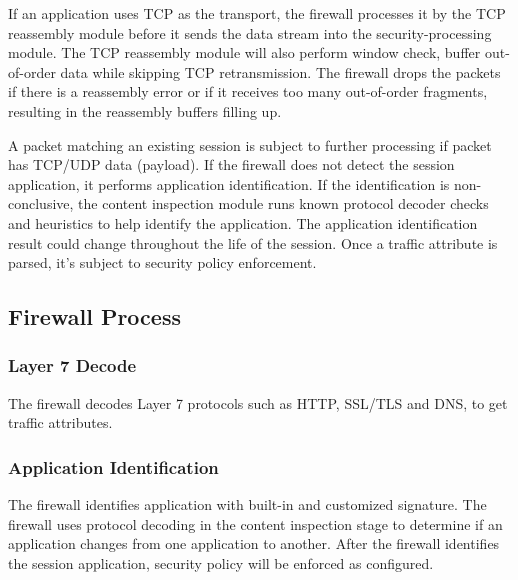 If an application uses TCP as the transport, the firewall processes it by the TCP reassembly module before it sends the data stream into the security-processing module. The TCP reassembly module will also perform window check, buffer out-of-order data while skipping TCP retransmission. The firewall drops the packets if there is a reassembly error or if it receives too many out-of-order fragments, resulting in the reassembly buffers filling up.


A packet matching an existing session is subject to further processing if packet has TCP/UDP data (payload). If the firewall does not detect the session application, it performs application identification. If the identification is non-conclusive, the content inspection module runs known protocol decoder checks and heuristics to help identify the application. The application identification result could change throughout the life of the session. Once a traffic attribute is parsed, it’s subject to security policy enforcement.

\subsection*{\hypertarget{link:Firewall Process}{Firewall Process}}
\label{sec:appendix_e:sequence:firewall}

\subsubsection*{\hypertarget{link:Layer 7 Decode}{Layer 7 Decode}}
\label{sec:appendix_e:sequence:firewall:decode}

The firewall decodes Layer 7 protocols such as HTTP, SSL/TLS and DNS, to get traffic attributes.

\subsubsection*{\hypertarget{link:Application Identification}{Application Identification}}
\label{sec:appendix_e:sequence:firewall:identification}

The firewall identifies application with built-in and customized signature. The firewall uses protocol decoding in the content inspection stage to determine if an application changes from one application to another. After the firewall identifies the session application, security policy will be enforced as configured. 

